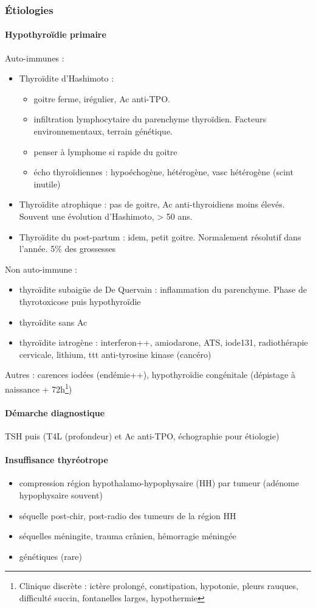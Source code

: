 \documentclass[11pt]{article}
\begin{document}
\subsubsection{Étiologies}
\label{sec:org24e3160}
\paragraph{Hypothyroïdie primaire}
\label{sec:org3572ca9}
Auto-immunes :
\begin{itemize}
\item Thyroïdite d'Hashimoto : 
\begin{itemize}
\item goitre ferme, irégulier, Ac anti-TPO.
\item infiltration lymphocytaire du parenchyme thyroïdien. Facteurs environnementaux,
terrain génétique.
\item penser à lymphome si \inc rapide du goitre
\item écho thyroïdiennes : hypoéchogène, hétérogène, vasc hétérogène (scint
inutile)
\end{itemize}
\item Thyroïdite atrophique : pas de goitre, Ac anti-thyroidiens moins
élevés. Souvent une évolution d'Hashimoto, > 50 ans.
\item Thyroïdite du post-partum : idem, petit goitre. Normalement résolutif dans
l'année. 5\% des grossesses
\end{itemize}
Non auto-immune :
\begin{itemize}
\item thyroïdite subaigüe de De Quervain : inflammation du parenchyme. Phase de
thyrotoxicose puis hypothyroïdie
\item thyroïdite sans Ac
\item thyroïdite iatrogène : interferon++, amiodarone, ATS, iode131, radiothérapie
cervicale, lithium, ttt anti-tyrosine kinase (cancéro)
\end{itemize}
Autres : carences iodées (endémie++), hypothyroïdie congénitale (dépistage à
naissance + 72h\footnote{Clinique discrète : ictère prolongé, constipation, hypotonie, pleurs
rauques, difficulté succin, fontanelles larges, hypothermie})

\paragraph{Démarche diagnostique}
\label{sec:orgfd8b852}
TSH puis (T4L (profondeur) et Ac anti-TPO, échographie pour étiologie)
\paragraph{Insuffisance thyréotrope}
\label{sec:orgb00ad84}
\begin{itemize}
\item compression région hypothalamo-hypophysaire (HH) par tumeur (adénome hypophysaire
souvent)
\item séquelle post-chir, post-radio des tumeurs de la région HH
\item séquelles méningite, trauma crânien, hémorragie méningée
\item génétiques (rare)
\end{itemize}
\end{document}
